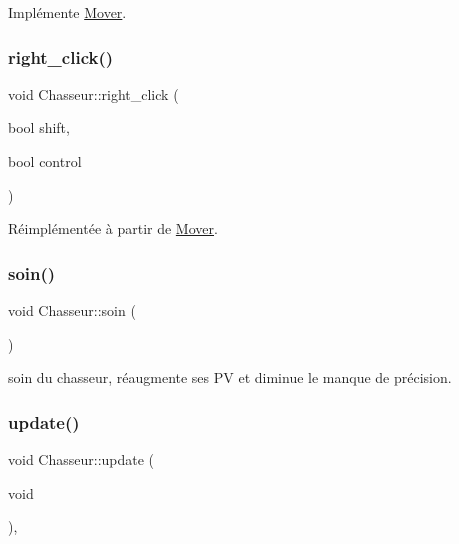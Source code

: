 Implémente \hyperlink{classMover_a6d794056f34e2348d32ae4ff49326070}{Mover}.

\mbox{\label{classChasseur_ac33c7c026b2bb1c05d074fa196bd1fae}} 
\subsubsection{\texorpdfstring{right\+\_\+click()}{right\_click()}}
{\footnotesize\ttfamily void Chasseur\+::right\+\_\+click (\begin{DoxyParamCaption}\item[{bool}]{shift,  }\item[{bool}]{control }\end{DoxyParamCaption})\hspace{0.3cm}{\ttfamily [virtual]}}



Réimplémentée à partir de \hyperlink{classMover_ac32ed126c01d60c6df0090dd590b70b2}{Mover}.

\mbox{\label{classChasseur_a12f5813aa74534ad928c788ddbcd2c31}} 
\subsubsection{\texorpdfstring{soin()}{soin()}}
{\footnotesize\ttfamily void Chasseur\+::soin (\begin{DoxyParamCaption}{ }\end{DoxyParamCaption})\hspace{0.3cm}{\ttfamily [inline]}}



soin du chasseur, réaugmente ses PV et diminue le manque de précision. 

\mbox{\label{classChasseur_a6ea64de0a2708b21326dcb980f0e06ac}} 
\subsubsection{\texorpdfstring{update()}{update()}}
{\footnotesize\ttfamily void Chasseur\+::update (\begin{DoxyParamCaption}\item[{void}]{ }\end{DoxyParamCaption})\hspace{0.3cm}{\ttfamily [inline]}, {\ttfamily [virtual]}}



